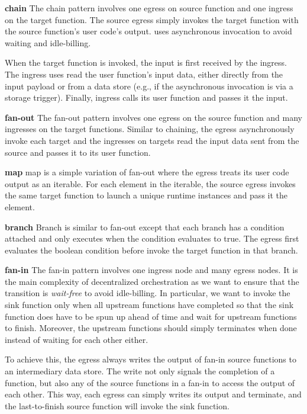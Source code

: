 \noindent\textbf{chain} 
The chain pattern involves one egress on source function and one ingress on
the target function. The source egress simply invokes the target function with
the source function's user code's output. \name{} uses asynchronous invocation
to avoid waiting and idle-billing.

When the target function is invoked, the input is first received by the
\name{} ingress. The ingress uses read the user function's input data, either
directly from the input payload or from a data store (e.g., if the
asynchronous invocation is via a storage trigger). Finally, ingress calls its
user function and passes it the input.

\noindent\textbf{fan-out}
The fan-out pattern involves one egress on the source function and many
ingresses on the target functions.
Similar to chaining, the egress asynchronously invoke each target and the
ingresses on targets read the input data sent from the source and passes it to
its user function.

\noindent\textbf{map}
map is a simple variation of fan-out where the egress treats its user code
output as an iterable. For each element in the iterable, the source egress
invokes the same target function to launch a unique runtime instances and pass
it the element.

\noindent\textbf{branch}
Branch is similar to fan-out except that each branch has a condition attached
and only executes when the condition evaluates to true. The egress first
evaluates the boolean condition before invoke the target function in that
branch.

\textbf{fan-in}
The fan-in pattern involves one ingress node and many egress nodes.
It is the main complexity of decentralized orchestration as we want to ensure
that the transition is \emph{wait-free} to avoid idle-billing. In particular,
we want to invoke the sink function only when all upstream functions have
completed so that the sink function does have to be spun up ahead of time and
wait for upstream functions to finish. Moreover, the upstream functions should
simply terminates when done instead of waiting for each other either.

To achieve this, the \name{} egress always writes the output of fan-in source
functions to an intermediary data store. The write not only signals the
completion of a function, but also any of the source functions in a fan-in to
access the output of each other. This way, each egress can simply writes its
output and terminate, and the last-to-finish source function will invoke the
sink function.

